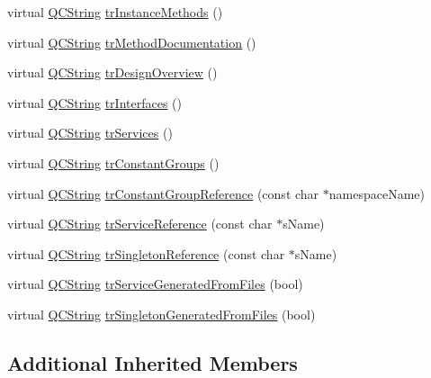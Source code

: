 \begin{DoxyCompactItemize}
virtual \mbox{\hyperlink{class_q_c_string}{Q\+C\+String}} \mbox{\hyperlink{class_translator_chinesetraditional_afab284f06e27847d9e7644a4fbe58d3a}{tr\+Instance\+Methods}} ()
\item 
virtual \mbox{\hyperlink{class_q_c_string}{Q\+C\+String}} \mbox{\hyperlink{class_translator_chinesetraditional_a9fd0d0249670ff6273e43449ef315c49}{tr\+Method\+Documentation}} ()
\item 
virtual \mbox{\hyperlink{class_q_c_string}{Q\+C\+String}} \mbox{\hyperlink{class_translator_chinesetraditional_a28a04fe5921fbe1690c31a043538b588}{tr\+Design\+Overview}} ()
\item 
virtual \mbox{\hyperlink{class_q_c_string}{Q\+C\+String}} \mbox{\hyperlink{class_translator_chinesetraditional_af2de8c3ebf596f3829145dac56a3931c}{tr\+Interfaces}} ()
\item 
virtual \mbox{\hyperlink{class_q_c_string}{Q\+C\+String}} \mbox{\hyperlink{class_translator_chinesetraditional_a0fed5291443bec412ebc9090507552a0}{tr\+Services}} ()
\item 
virtual \mbox{\hyperlink{class_q_c_string}{Q\+C\+String}} \mbox{\hyperlink{class_translator_chinesetraditional_a476250d59fc7c2599b65b052287b3505}{tr\+Constant\+Groups}} ()
\item 
virtual \mbox{\hyperlink{class_q_c_string}{Q\+C\+String}} \mbox{\hyperlink{class_translator_chinesetraditional_ad4481567c4ff9e4a01302ae6aa3a34e3}{tr\+Constant\+Group\+Reference}} (const char $\ast$namespace\+Name)
\item 
virtual \mbox{\hyperlink{class_q_c_string}{Q\+C\+String}} \mbox{\hyperlink{class_translator_chinesetraditional_ad3ce43e1363103ca2a4a6197810175f2}{tr\+Service\+Reference}} (const char $\ast$s\+Name)
\item 
virtual \mbox{\hyperlink{class_q_c_string}{Q\+C\+String}} \mbox{\hyperlink{class_translator_chinesetraditional_a1e77bfd70f909c07ca8228c1338290ea}{tr\+Singleton\+Reference}} (const char $\ast$s\+Name)
\item 
virtual \mbox{\hyperlink{class_q_c_string}{Q\+C\+String}} \mbox{\hyperlink{class_translator_chinesetraditional_aa04c12d76779e28486e8a64f2bb4cd56}{tr\+Service\+Generated\+From\+Files}} (bool)
\item 
virtual \mbox{\hyperlink{class_q_c_string}{Q\+C\+String}} \mbox{\hyperlink{class_translator_chinesetraditional_a60900998951da84cb71da00b797a3648}{tr\+Singleton\+Generated\+From\+Files}} (bool)
\end{DoxyCompactItemize}
\subsection*{Additional Inherited Members}



